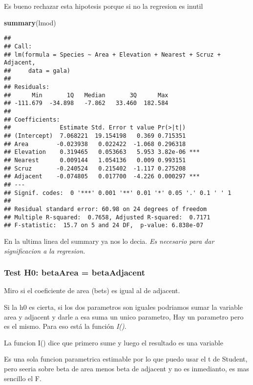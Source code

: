 \documentclass[
]{article}
\newenvironment{Shaded}{\begin{snugshade}}{\end{snugshade}}
\newcommand{\FunctionTok}[1]{\textcolor[rgb]{0.13,0.29,0.53}{\textbf{#1}}}
\newcommand{\NormalTok}[1]{#1}
\begin{document}
Es bueno rechazar esta hipotesis porque si no la regresion es inutil

\begin{Shaded}
\begin{Highlighting}[]
\FunctionTok{summary}\NormalTok{(lmod)}
\end{Highlighting}
\end{Shaded}

\begin{verbatim}
## 
## Call:
## lm(formula = Species ~ Area + Elevation + Nearest + Scruz + Adjacent, 
##     data = gala)
## 
## Residuals:
##      Min       1Q   Median       3Q      Max 
## -111.679  -34.898   -7.862   33.460  182.584 
## 
## Coefficients:
##              Estimate Std. Error t value Pr(>|t|)    
## (Intercept)  7.068221  19.154198   0.369 0.715351    
## Area        -0.023938   0.022422  -1.068 0.296318    
## Elevation    0.319465   0.053663   5.953 3.82e-06 ***
## Nearest      0.009144   1.054136   0.009 0.993151    
## Scruz       -0.240524   0.215402  -1.117 0.275208    
## Adjacent    -0.074805   0.017700  -4.226 0.000297 ***
## ---
## Signif. codes:  0 '***' 0.001 '**' 0.01 '*' 0.05 '.' 0.1 ' ' 1
## 
## Residual standard error: 60.98 on 24 degrees of freedom
## Multiple R-squared:  0.7658, Adjusted R-squared:  0.7171 
## F-statistic:  15.7 on 5 and 24 DF,  p-value: 6.838e-07
\end{verbatim}

En la ultima linea del summary ya nos lo decia. \emph{Es necesario para
dar significacion a la regresion.}

\hypertarget{test-h0-betaarea-betaadjacent}{%
\subsubsection{Test H0: betaArea =
betaAdjacent}\label{test-h0-betaarea-betaadjacent}}

Miro si el coeficiente de area (bets) es igual al de adjacent.

Si la h0 es cierta, si los dos parametros son iguales podriamos sumar la
variable area y adjacent y darle a esa suma un unico parametro, Hay un
parametro pero es el mismo. Para eso está la función \emph{I()}.

La funcion I() dice que primero sume y luego el resultado es una
variable

Es una sola funcion parametrica estimable por lo que puedo usar el t de
Student, pero seeria sobre beta de area menos beta de adjacent y no es
inmedianto, es mas sencillo el F.
\end{document}
